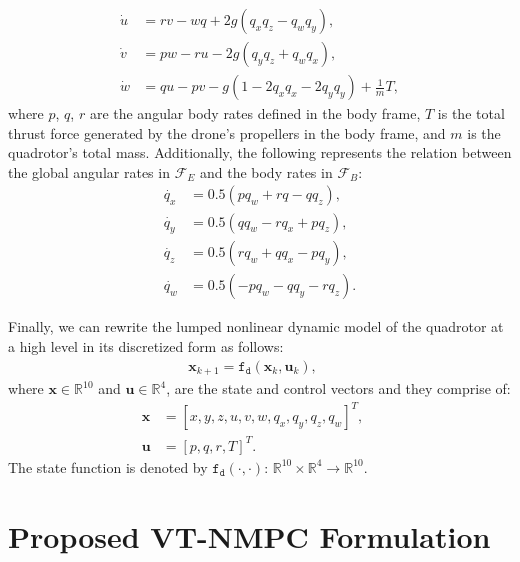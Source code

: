 %
\begin{subequations} \label{eq:force}
\begin{align}
	\dot{u} &= r v - w q + 2 g (q_x  q_z - q_w  q_y), \label{eq:force_x} \\
	\dot{v} &= p w - r u - 2 g (q_y  q_z + q_w  q_x),  \label{eq:force_y} \\
	\dot{w} &= q u - p v - g (1 - 2 q_x  q_x - 2  q_y  q_y)  + \frac{1}{m} T, \label{eq:force_z} 
\end{align}
\end{subequations}
%
where $p$, $q$, $r$ are the angular body rates defined in the body frame, $T$ is the total thrust force generated by the drone's propellers in the body frame, and $m$ is the quadrotor's total mass. Additionally, the following represents the relation between the global angular rates in $\mathcal{F}_E$ and the body rates in $\mathcal{F}_B$:
%
\begin{subequations} \label{eq:rates}
\begin{align}
	\dot{q_x} &= 0.5 (p q_w + r q - q q_z), \\
    \dot{q_y} &= 0.5  (q q_w - r q_x + p q_z), \\
    \dot{q_z} &= 0.5 (r q_w + q q_x - p q_y), \\
    \dot{q_w} &= 0.5 (-p q_w - q q_y - r q_z).
\end{align}
\end{subequations}
%

Finally, we can rewrite the lumped nonlinear dynamic model of the quadrotor at a high level in its discretized form as follows:
%
\begin{align} \label{eq:model_eqs}
    \mathbf{x}_{k+1} = \mathtt{f_d}(\mathbf{x}_k,\mathbf{u}_k),  \quad
\end{align}
%
where $\mathbf{x} \in \mathbb{R}^{10}$ and $\mathbf{u} \in \mathbb{R}^{4}$, are the state and control vectors and they comprise of:
\begin{align}
    \mathbf{x} &= [x,y,z,u,v,w, q_x,q_y,q_z,q_w]^T, \quad  \\
    \mathbf{u} &= [p,q,r,T]^T.
\end{align}
The state function is denoted by $\mathtt{f_d}(\cdot,\cdot)$: $\mathbb{R}^{10} \times \mathbb{R}^{4} \rightarrow \mathbb{R}^{10}$.


\section{Proposed VT-NMPC Formulation}
\label{sec:design}

